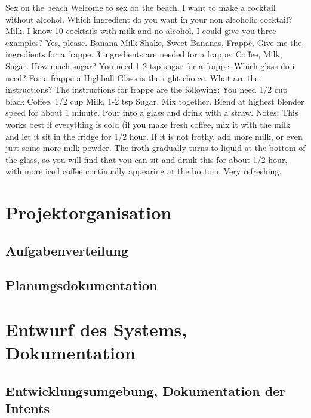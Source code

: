 \documentclass[12pt,letterpaper]{article}
\begin{document}
\begin{dialogue}
	 Sex on the beach
	 Welcome to sex on the beach.
	 I want to make a cocktail without alcohol.
	 Which ingredient do you want in your non alcoholic cocktail?
	 Milk.
	 I know 10 cocktails with milk and no alcohol. I could give you three examples?
	 Yes, please.
	 Banana Milk Shake, Sweet Bananas, Frappé.
	 Give me the ingredients for a frappe.
	 3 ingredients are needed for a frappe: Coffee, Milk, Sugar.
	 How much sugar?
	 You need 1-2 tsp sugar for a frappe.
	 Which glass do i need?
	 For a frappe a Highball Glass is the right choice.
	 What are the instructions?
	 The instructions for frappe are the following: You need 1/2 cup black Coffee, 1/2 cup Milk, 1-2 tsp Sugar. Mix together. Blend at highest blender speed for about 1 minute. Pour into a glass and drink with a straw. Notes: This works best if everything is cold (if you make fresh coffee, mix it with the milk and let it sit in the fridge for 1/2 hour. If it is not frothy, add more milk, or even just some more milk powder. The froth gradually turns to liquid at the bottom of the glass, so you will find that you can sit and drink this for about 1/2 hour, with more iced coffee continually appearing at the bottom. Very refreshing.
	
\end{dialogue}

\section{Projektorganisation}
\subsection{Aufgabenverteilung}
\subsection{Planungsdokumentation}

\section{Entwurf des Systems, Dokumentation}
\subsection{Entwicklungsumgebung, Dokumentation der Intents}
\end{document}
